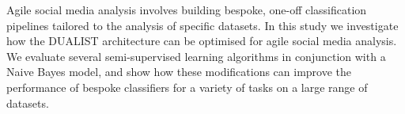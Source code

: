 Agile social media analysis involves building bespoke, one-off classification pipelines tailored to the analysis of specific datasets. In this study we investigate how the DUALIST architecture can be optimised for agile social media analysis. We evaluate several semi-supervised learning algorithms in conjunction with a Naive Bayes model, and show how these modifications can improve the performance of bespoke classifiers for a variety of tasks on a large range of datasets.
